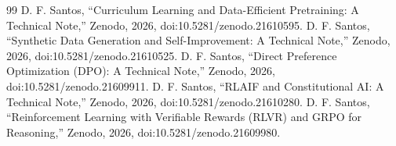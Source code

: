 \documentclass[conference]{IEEEtran}
\begin{document}
\begin{thebibliography}{99}
 D. F. Santos, ``Curriculum Learning and Data-Efficient Pretraining: A Technical Note,'' Zenodo, 2026, doi:10.5281/zenodo.21610595.
 D. F. Santos, ``Synthetic Data Generation and Self-Improvement: A Technical Note,'' Zenodo, 2026, doi:10.5281/zenodo.21610525.
 D. F. Santos, ``Direct Preference Optimization (DPO): A Technical Note,'' Zenodo, 2026, doi:10.5281/zenodo.21609911.
 D. F. Santos, ``RLAIF and Constitutional AI: A Technical Note,'' Zenodo, 2026, doi:10.5281/zenodo.21610280.
 D. F. Santos, ``Reinforcement Learning with Verifiable Rewards (RLVR) and GRPO for Reasoning,'' Zenodo, 2026, doi:10.5281/zenodo.21609980.
\end{thebibliography}
\end{document}
